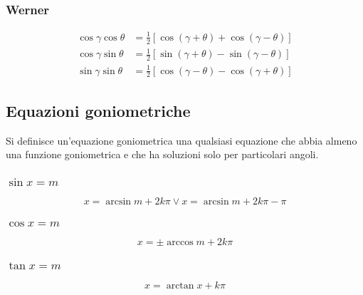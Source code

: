 \subsubsection{Werner}
\begin{align*}
  \cos\gamma\cos\theta &= \frac{1}{2}[\cos(\gamma+\theta)+\cos(\gamma-\theta)]\\
  \cos\gamma\sin\theta &= \frac{1}{2}[\sin(\gamma+\theta)-\sin(\gamma-\theta)]\\
  \sin\gamma\sin\theta &= \frac{1}{2}[\cos(\gamma-\theta)-\cos(\gamma+\theta)]
\end{align*}

\subsection{Equazioni goniometriche}
Si definisce un'equazione goniometrica una qualsiasi equazione che abbia almeno una funzione 
goniometrica e che ha soluzioni solo per particolari angoli.
\subsubsection{$\sin x = m$}
\begin{equation*}
  x = \arcsin m + 2k\pi \lor  x = \arcsin m +2k\pi-\pi
\end{equation*}

\subsubsection{$\cos x = m$}
\begin{equation*}
  x = \pm\arccos m + 2k\pi
\end{equation*}

\subsubsection{$\tan x = m$}
\begin{equation*}
  x = \arctan x + k\pi
\end{equation*}

